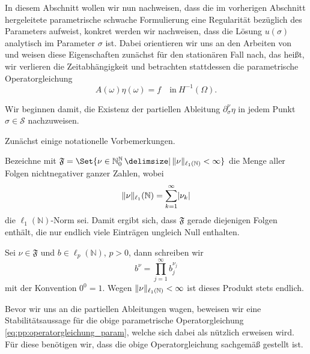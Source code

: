 In diesem Abschnitt wollen wir nun nachweisen, dass die im vorherigen Abschnitt hergeleitete parametrische schwache Formulierung eine Regularität bezüglich des Parameters aufweist, konkret werden wir nachweisen, dass die Lösung $u(\sigma)$ analytisch im Parameter $\sigma$ ist.
Dabei orientieren wir uns an den Arbeiten von \textcite{Cohen:2010kz,Kunoth:2013ef} und weisen diese Eigenschaften zunächst für den stationären Fall nach, das heißt, wir verlieren die Zeitabhängigkeit und betrachten stattdessen die parametrische Operatorgleichung
\begin{equation}
\label{eq:pp:operatorgleichung_param}
    A(\omega) \eta(\omega) = f \quad \text{in}~H^{-1}(\Omega).
\end{equation}

Wir beginnen damit, die Existenz der partiellen Ableitung $\partial^{\nu}_{\sigma} \eta$ in jedem Punkt $\sigma \in \mathcal S$ nachzuweisen.

Zunächst einige notationelle Vorbemerkungen.
\begin{Bemerkung}
    Bezeichne mit $\mathfrak F = \Set{ \nu \in \mathbb{N}^{\mathbb{N}}_{0} \given \norm{\nu}_{\ell_{1}(\mathbb{N})} < \infty }$ die Menge aller Folgen nichtnegativer ganzer Zahlen, wobei
    \begin{equation}
        \lVert\nu\rVert_{\ell_{1}}(\mathbb{N}) = \sum_{k = 1}^{\infty} \lvert\nu_{k}\rvert
    \end{equation}
    die $\ell_{1}(\mathbb{N})$-Norm sei.
    Damit ergibt sich, dass $\mathfrak F$ gerade diejenigen Folgen enthält, die nur endlich viele Einträgen ungleich Null enthalten.

    Sei $\nu \in \mathfrak F$ und $b \in \ell_{p}(\mathbb{N})$, $p > 0$, dann schreiben wir
    \begin{equation}
        b^{\nu} = \prod_{j = 1}^{\infty} b_{j}^{\nu_{j}}
    \end{equation}
    mit der Konvention $0^{0} = 1$.
    Wegen $\lVert\nu\rVert_{\ell_{1}(\mathbb{N})} < \infty$ ist dieses Produkt stets endlich.
\end{Bemerkung}

Bevor wir uns an die partiellen Ableitungen wagen, beweisen wir eine Stabilitätsaussage für die obige parametrische Operatorgleichung \cref{eq:pp:operatorgleichung_param}, welche sich dabei als nützlich erweisen wird.
Für diese benötigen wir, dass die obige Operatorgleichung sachgemäß gestellt ist.

